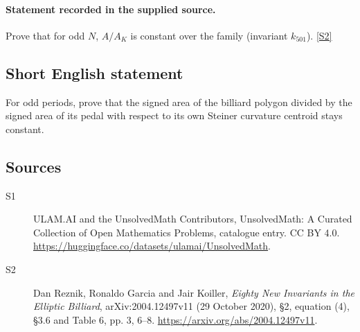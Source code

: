 \documentclass[11pt]{article}
\newcommand{\sref}[2]{\hyperlink{source:#1:#2}{[S#2]}}
\begin{document}
\paragraph{Statement recorded in the supplied source.}
Prove that for odd $N$, $A/A_K$ is constant over the family (invariant $k_{501}$). \sref{statement}{2}
\subsection{Short English statement}
For odd periods, prove that the signed area of the billiard polygon divided by the signed area of its pedal with respect to its own Steiner curvature centroid stays constant.
\subsection{Sources}
\begin{description}
\item[\hypertarget{source:statement:1}{S1}] ULAM.AI and the UnsolvedMath Contributors, UnsolvedMath: A Curated Collection of Open Mathematics Problems, catalogue entry. CC BY 4.0. \url{https://huggingface.co/datasets/ulamai/UnsolvedMath}.
\item[\hypertarget{source:statement:2}{S2}] Dan Reznik, Ronaldo Garcia and Jair Koiller, \emph{Eighty New Invariants in the Elliptic Billiard}, arXiv:2004.12497v11 (29 October 2020), \S2, equation (4), \S3.6 and Table 6, pp. 3, 6--8. \url{https://arxiv.org/abs/2004.12497v11}.
\end{description}
\label{end:statement}
\end{document}
